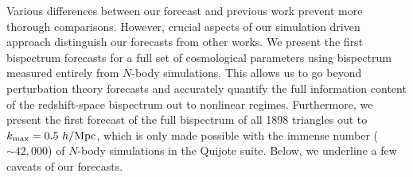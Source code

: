 Various differences between our forecast and previous work prevent more 
thorough comparisons. However, crucial aspects of our simulation driven 
approach distinguish our forecasts from other works. %
We present the first bispectrum forecasts for a full set of cosmological 
parameters using bispectrum measured entirely from $N$-body simulations.
This allows us to go beyond perturbation theory forecasts and accurately 
quantify the full information content of the redshift-space bispectrum out to 
nonlinear regimes. Furthermore, we present the first forecast of the full 
bispectrum of all 1898 triangles out to $k_{\rm max} = 0.5~h/{\rm Mpc}$, which is 
only made possible with the immense number ($\sim42,000$) of $N$-body 
simulations in the Quijote suite. %
Below, we underline a few caveats of our forecasts.

